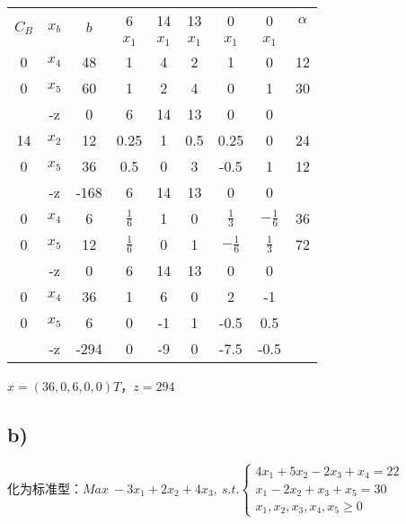 \documentclass{article}
\begin{document}
	\begin{tabular}{|c|c|c|ccccc|c|}
		\hline
		\multirow{2}{*}{$C_B$} & \multirow{2}{*}{$x_b$} & \multirow{2}{*}{$b$} &6&14&13&0&0 & $\alpha$ \\
		\cline{4-8}
		&   & & $x_1$ & $x_1$ & $x_1$ & $x_1$ & $x_1$ & \\
		\hline
		0 & $x_4$ & 48 & 1&4&2&1&0&12\\
		0 & $x_5$ & 60 & 1&2&4&0&1&30\\
		
		\hline
		& -z & 0 & 6&14&13&0&0 & \\
		\hline
		14 & $x_2$ & 12 &0.25&1&0.5&0.25&0&24\\
		0 & $x_5$ & 36 &0.5&0&3&-0.5&1&12\\
		
		\hline
		& -z & -168 & 6&14&13&0&0 & \\
		\hline
		0 & $x_4$ & 6 & $\frac{1}{6}$&1&0&$\frac{1}{3}$&$-\frac{1}{6}$&36\\
		0 & $x_5$ & 12 & $\frac{1}{6}$&0&1&$-\frac{1}{6}$&$\frac{1}{3}$&72\\
		
		\hline
		& -z & 0 & 6&14&13&0&0 & \\
		\hline
		0 & $x_4$ & 36 & 1&6&0&2&-1&\\
		0 & $x_5$ & 6 & 0&-1&1&-0.5&0.5&\\
		
		\hline
		& -z & -294 & 0&-9&0&-7.5&-0.5 & \\
		
		\hline
	\end{tabular}
	
	$x=(36,0,6,0,0)T$，$z=294$
	
	\subsection*{b)}
	
	化为标准型：$Max\ -3x_1+2x_2+4x_3,\ s.t. \begin{cases}
		4x_1+5x_2-2x_3+x_4=22\\
		x_1-2x_2+x_3+x_5=30\\
		x_1, x_2, x_3, x_4, x_5 \geq 0
	\end{cases} $
	
\end{document}
